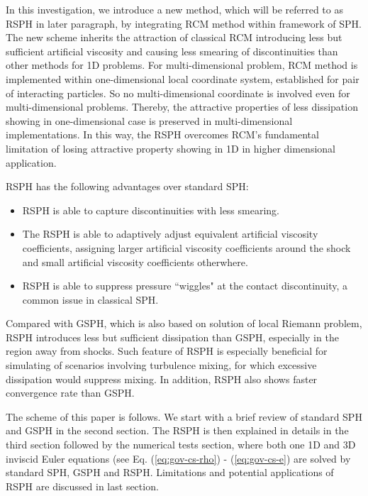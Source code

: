\documentclass[review]{elsarticle}
\begin{document}
In this investigation, we introduce a new method, which will be referred to as RSPH in later paragraph, by integrating RCM method within framework of SPH. 
The new scheme inherits the attraction of classical RCM introducing less but sufficient artificial viscosity and causing less smearing of discontinuities than other methods for 1D problems. 
For multi-dimensional problem, RCM method is implemented within one-dimensional local coordinate system, established for pair of interacting particles. So no multi-dimensional coordinate is involved even for multi-dimensional problems. Thereby, the attractive properties of less dissipation showing in one-dimensional case is preserved in multi-dimensional implementations. In this way, the RSPH overcomes RCM's fundamental limitation of losing attractive property showing in 1D in higher dimensional application.

RSPH has the following advantages over standard SPH:
\begin{itemize}
\item RSPH is able to capture discontinuities with less smearing.
\item The RSPH is able to adaptively adjust equivalent artificial viscosity coefficients, assigning larger artificial viscosity coefficients around the shock and small artificial viscosity coefficients otherwhere.
\item RSPH is able to suppress pressure ``wiggles" at the contact discontinuity, a common issue in classical SPH.
\end{itemize}
Compared with GSPH, which is also based on solution of local Riemann problem, RSPH introduces less but sufficient dissipation than GSPH, especially in the region away from shocks. Such feature of RSPH is especially beneficial for simulating of scenarios involving turbulence mixing, for which excessive dissipation would suppress mixing. In addition, RSPH also shows faster convergence rate than GSPH.

The scheme of this paper is follows. We start with a brief review of standard SPH and GSPH in the second section. The RSPH is then explained in details in the third section followed by the numerical tests section, where both one 1D and 3D inviscid Euler equations (see Eq. (\ref{eq:gov-cs-rho}) - (\ref{eq:gov-cs-e}) are solved by standard SPH, GSPH and RSPH. Limitations and potential applications of RSPH are discussed in last section. 
\end{document}
